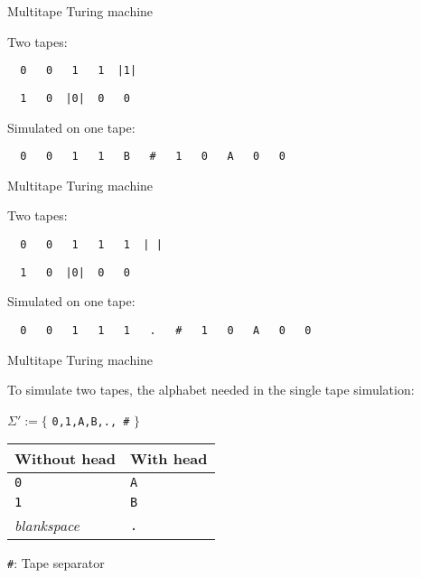 \documentclass[
  ignorenonframetext,
]{beamer}
\begin{document}
\begin{frame}[fragile]{Multitape Turing machine}
\protect\hypertarget{multitape-turing-machine-7}{}

Two tapes:

\begin{verbatim}
  0   0   1   1  |1|
\end{verbatim}

\begin{verbatim}
  1   0  |0|  0   0
\end{verbatim}

Simulated on one tape:

\begin{verbatim}
  0   0   1   1   B   #   1   0   A   0   0
\end{verbatim}

\end{frame}

\begin{frame}[fragile]{Multitape Turing machine}
\protect\hypertarget{multitape-turing-machine-8}{}

Two tapes:

\begin{verbatim}
  0   0   1   1   1  | |
\end{verbatim}

\begin{verbatim}
  1   0  |0|  0   0
\end{verbatim}

Simulated on one tape:

\begin{verbatim}
  0   0   1   1   1   .   #   1   0   A   0   0
\end{verbatim}

\end{frame}

\begin{frame}[fragile]{Multitape Turing machine}
\protect\hypertarget{multitape-turing-machine-9}{}

To simulate two tapes, the alphabet needed in the single tape
simulation:

\(\Sigma':=\{\) \texttt{0,1,A,B,.,\ \#} \(\}\)

\begin{longtable}[]{@{}ll@{}}
\toprule
Without head & With head\tabularnewline
\midrule
\endhead
\texttt{0} & \texttt{A}\tabularnewline
\texttt{1} & \texttt{B}\tabularnewline
\emph{blankspace} & \texttt{.}\tabularnewline
\bottomrule
\end{longtable}

\texttt{\#}: Tape separator

\end{frame}
\end{document}
